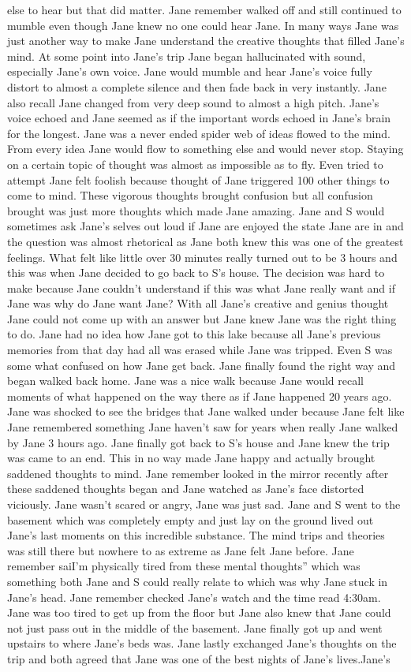 \documentclass[12pt]{book}
\begin{document}
else to hear but that did matter. Jane remember walked off and still continued to mumble even though Jane knew no one could hear Jane. In many ways Jane was just another way to make Jane understand the creative thoughts that filled Jane's mind. At some point into Jane's trip Jane began hallucinated with sound, especially Jane's own voice. Jane would mumble and hear Jane's voice fully distort to almost a complete silence and then fade back in very instantly. Jane also recall Jane changed from very deep sound to almost a high pitch. Jane's voice echoed and Jane seemed as if the important words echoed in Jane's brain for the longest. Jane was a never ended spider web of ideas flowed to the mind. From every idea Jane would flow to something else and would never stop. Staying on a certain topic of thought was almost as impossible as to fly. Even tried to attempt Jane felt foolish because thought of Jane triggered 100 other things to come to mind. These vigorous thoughts brought confusion but all confusion brought was just more thoughts which made Jane amazing. Jane and S would sometimes ask Jane's selves out loud if Jane are enjoyed the state Jane are in and the question was almost rhetorical as Jane both knew this was one of the greatest feelings. What felt like little over 30 minutes really turned out to be 3 hours and this was when Jane decided to go back to S's house. The decision was hard to make because Jane couldn't understand if this was what Jane really want and if Jane was why do Jane want Jane? With all Jane's creative and genius thought Jane could not come up with an answer but Jane knew Jane was the right thing to do. Jane had no idea how Jane got to this lake because all Jane's previous memories from that day had all was erased while Jane was tripped. Even S was some what confused on how Jane get back. Jane finally found the right way and began walked back home. Jane was a nice walk because Jane would recall moments of what happened on the way there as if Jane happened 20 years ago. Jane was shocked to see the bridges that Jane walked under because Jane felt like Jane remembered something Jane haven't saw for years when really Jane walked by Jane 3 hours ago. Jane finally got back to S's house and Jane knew the trip was came to an end. This in no way made Jane happy and actually brought saddened thoughts to mind. Jane remember looked in the mirror recently after these saddened thoughts began and Jane watched as Jane's face distorted viciously. Jane wasn't scared or angry, Jane was just sad. Jane and S went to the basement which was completely empty and just lay on the ground lived out Jane's last moments on this incredible substance. The mind trips and theories was still there but nowhere to as extreme as Jane felt Jane before. Jane remember saiI'm physically tired from these mental thoughts'' which was something both Jane and S could really relate to which was why Jane stuck in Jane's head. Jane remember checked Jane's watch and the time read 4:30am. Jane was too tired to get up from the floor but Jane also knew that Jane could not just pass out in the middle of the basement. Jane finally got up and went upstairs to where Jane's beds was. Jane lastly exchanged Jane's thoughts on the trip and both agreed that Jane was one of the best nights of Jane's lives.Jane's 
\end{document}
